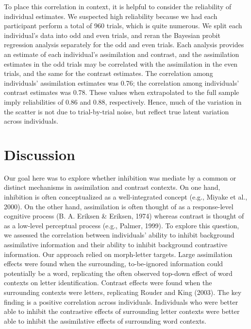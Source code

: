 \documentclass[english,floatsintext,man]{apa6}
\theoremstyle{definition}
\theoremstyle{definition}
\theoremstyle{remark}
\begin{document}
To place this correlation in context, it is helpful to consider the
reliability of individual estimates. We suspected high reliability
because we had each participant perform a total of 960 trials, which is
quite numerous. We split each individual's data into odd and even
trials, and reran the Bayesian probit regression analysis separately for
the odd and even trials. Each analysis provides an estimate of each
individual's assimilation and contrast, and the assimilation estimates
in the odd trials may be correlated with the assimilation in the even
trials, and the same for the contrast estimates. The correlation among
individuals' assimilation estimates was 0.76; the correlation among
individuals' contrast estimates was 0.78. These values when extrapolated
to the full sample imply reliabilities of 0.86 and 0.88, respectively.
Hence, much of the variation in the scatter is not due to trial-by-trial
noise, but reflect true latent variation across individuals.

\section{Discussion}\label{discussion}

Our goal here was to explore whether inhibition was mediate by a common
or distinct mechanisms in assimilation and contrast contexts. On one
hand, inhibition is often conceptualized as a well-integrated concept
(e.g., Miyake et al., 2000). On the other hand, assimilation is often
thought of as a response-level cognitive process (B. A. Eriksen \&
Eriksen, 1974) whereas contrast is thought of as a low-level perceptual
process (e.g., Palmer, 1999). To explore this question, we assessed the
correlation between individuals' ability to inhibit background
assimilative information and their ability to inhibit background
contrastive information. Our approach relied on morph-letter targets.
Large assimilation effects were found when the surrounding,
to-be-ignored information could potentially be a word, replicating the
often observed top-down effect of word contexts on letter
identification. Contrast effects were found when the surrounding
contexts were letters, replicating Rouder and King (2003). The key
finding is a positive correlation across individuals. Individuals who
were better able to inhibit the contrastive effects of surrounding
letter contexts were better able to inhibit the assimilative effects of
surrounding word contexts.
\end{document}
